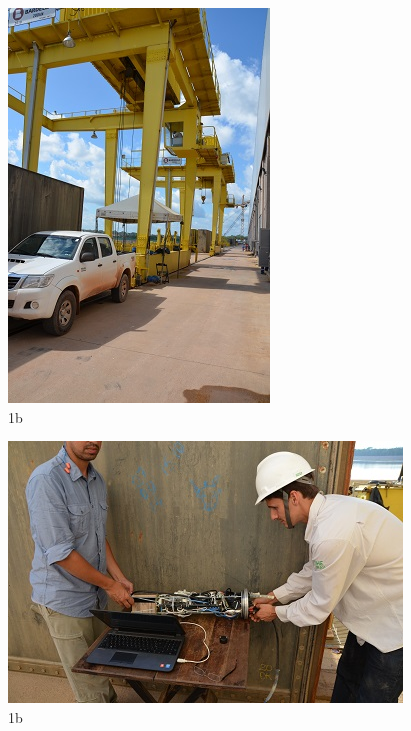 \begin{figure}[h!]
  \centering
  \includegraphics[width=1\linewidth]{Fotos/Novembro2014/11.jpg}
  \caption{1b}
  \label{nov20136}
\end{figure}

\begin{figure}[h!]
  \centering
  \includegraphics[width=1\linewidth]{Fotos/Novembro2014/12.jpg}
  \caption{1b}
  \label{nov20136}
\end{figure}